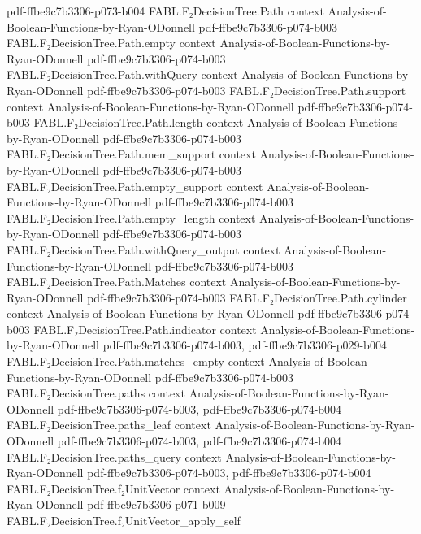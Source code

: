\begin{theorem}
  {pdf-ffbe9c7b3306-p073-b004}
\proofstep
  {FABL.F₂DecisionTree.Path}
  {context}
  {Analysis-of-Boolean-Functions-by-Ryan-ODonnell}
  {pdf-ffbe9c7b3306-p074-b003}
\proofstep
  {FABL.F₂DecisionTree.Path.empty}
  {context}
  {Analysis-of-Boolean-Functions-by-Ryan-ODonnell}
  {pdf-ffbe9c7b3306-p074-b003}
\proofstep
  {FABL.F₂DecisionTree.Path.withQuery}
  {context}
  {Analysis-of-Boolean-Functions-by-Ryan-ODonnell}
  {pdf-ffbe9c7b3306-p074-b003}
\proofstep
  {FABL.F₂DecisionTree.Path.support}
  {context}
  {Analysis-of-Boolean-Functions-by-Ryan-ODonnell}
  {pdf-ffbe9c7b3306-p074-b003}
\proofstep
  {FABL.F₂DecisionTree.Path.length}
  {context}
  {Analysis-of-Boolean-Functions-by-Ryan-ODonnell}
  {pdf-ffbe9c7b3306-p074-b003}
\proofstep
  {FABL.F₂DecisionTree.Path.mem_support}
  {context}
  {Analysis-of-Boolean-Functions-by-Ryan-ODonnell}
  {pdf-ffbe9c7b3306-p074-b003}
\proofstep
  {FABL.F₂DecisionTree.Path.empty_support}
  {context}
  {Analysis-of-Boolean-Functions-by-Ryan-ODonnell}
  {pdf-ffbe9c7b3306-p074-b003}
\proofstep
  {FABL.F₂DecisionTree.Path.empty_length}
  {context}
  {Analysis-of-Boolean-Functions-by-Ryan-ODonnell}
  {pdf-ffbe9c7b3306-p074-b003}
\proofstep
  {FABL.F₂DecisionTree.Path.withQuery_output}
  {context}
  {Analysis-of-Boolean-Functions-by-Ryan-ODonnell}
  {pdf-ffbe9c7b3306-p074-b003}
\proofstep
  {FABL.F₂DecisionTree.Path.Matches}
  {context}
  {Analysis-of-Boolean-Functions-by-Ryan-ODonnell}
  {pdf-ffbe9c7b3306-p074-b003}
\proofstep
  {FABL.F₂DecisionTree.Path.cylinder}
  {context}
  {Analysis-of-Boolean-Functions-by-Ryan-ODonnell}
  {pdf-ffbe9c7b3306-p074-b003}
\proofstep
  {FABL.F₂DecisionTree.Path.indicator}
  {context}
  {Analysis-of-Boolean-Functions-by-Ryan-ODonnell}
  {pdf-ffbe9c7b3306-p074-b003,
    pdf-ffbe9c7b3306-p029-b004}
\proofstep
  {FABL.F₂DecisionTree.Path.matches_empty}
  {context}
  {Analysis-of-Boolean-Functions-by-Ryan-ODonnell}
  {pdf-ffbe9c7b3306-p074-b003}
\proofstep
  {FABL.F₂DecisionTree.paths}
  {context}
  {Analysis-of-Boolean-Functions-by-Ryan-ODonnell}
  {pdf-ffbe9c7b3306-p074-b003,
    pdf-ffbe9c7b3306-p074-b004}
\proofstep
  {FABL.F₂DecisionTree.paths_leaf}
  {context}
  {Analysis-of-Boolean-Functions-by-Ryan-ODonnell}
  {pdf-ffbe9c7b3306-p074-b003,
    pdf-ffbe9c7b3306-p074-b004}
\proofstep
  {FABL.F₂DecisionTree.paths_query}
  {context}
  {Analysis-of-Boolean-Functions-by-Ryan-ODonnell}
  {pdf-ffbe9c7b3306-p074-b003,
    pdf-ffbe9c7b3306-p074-b004}
\proofstep
  {FABL.F₂DecisionTree.f₂UnitVector}
  {context}
  {Analysis-of-Boolean-Functions-by-Ryan-ODonnell}
  {pdf-ffbe9c7b3306-p071-b009}
\proofstep
  {FABL.F₂DecisionTree.f₂UnitVector_apply_self}

\end{theorem}
